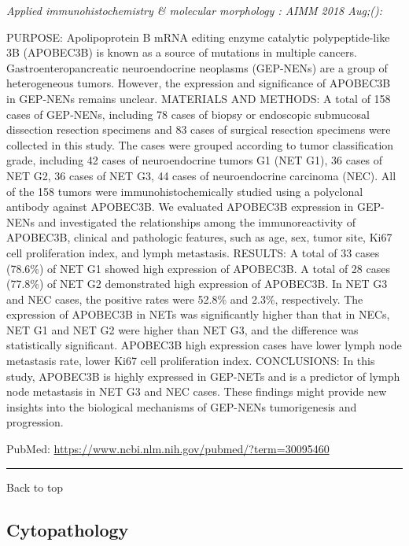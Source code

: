 \documentclass[]{article}
\begin{document}
\emph{Applied immunohistochemistry \& molecular morphology : AIMM 2018
Aug;():}

PURPOSE: Apolipoprotein B mRNA editing enzyme catalytic polypeptide-like
3B (APOBEC3B) is known as a source of mutations in multiple cancers.
Gastroenteropancreatic neuroendocrine neoplasms (GEP-NENs) are a group
of heterogeneous tumors. However, the expression and significance of
APOBEC3B in GEP-NENs remains unclear. MATERIALS AND METHODS: A total of
158 cases of GEP-NENs, including 78 cases of biopsy or endoscopic
submucosal dissection resection specimens and 83 cases of surgical
resection specimens were collected in this study. The cases were grouped
according to tumor classification grade, including 42 cases of
neuroendocrine tumors G1 (NET G1), 36 cases of NET G2, 36 cases of NET
G3, 44 cases of neuroendocrine carcinoma (NEC). All of the 158 tumors
were immunohistochemically studied using a polyclonal antibody against
APOBEC3B. We evaluated APOBEC3B expression in GEP-NENs and investigated
the relationships among the immunoreactivity of APOBEC3B, clinical and
pathologic features, such as age, sex, tumor site, Ki67 cell
proliferation index, and lymph metastasis. RESULTS: A total of 33 cases
(78.6\%) of NET G1 showed high expression of APOBEC3B. A total of 28
cases (77.8\%) of NET G2 demonstrated high expression of APOBEC3B. In
NET G3 and NEC cases, the positive rates were 52.8\% and 2.3\%,
respectively. The expression of APOBEC3B in NETs was significantly
higher than that in NECs, NET G1 and NET G2 were higher than NET G3, and
the difference was statistically significant. APOBEC3B high expression
cases have lower lymph node metastasis rate, lower Ki67 cell
proliferation index. CONCLUSIONS: In this study, APOBEC3B is highly
expressed in GEP-NETs and is a predictor of lymph node metastasis in NET
G3 and NEC cases. These findings might provide new insights into the
biological mechanisms of GEP-NENs tumorigenesis and progression.

PubMed: \url{https://www.ncbi.nlm.nih.gov/pubmed/?term=30095460}

{}

{}

\begin{center}\rule{0.5\linewidth}{\linethickness}\end{center}

Back to top

\pagebreak

\hypertarget{cytopathology}{%
\subsection{Cytopathology}\label{cytopathology}}
\end{document}
